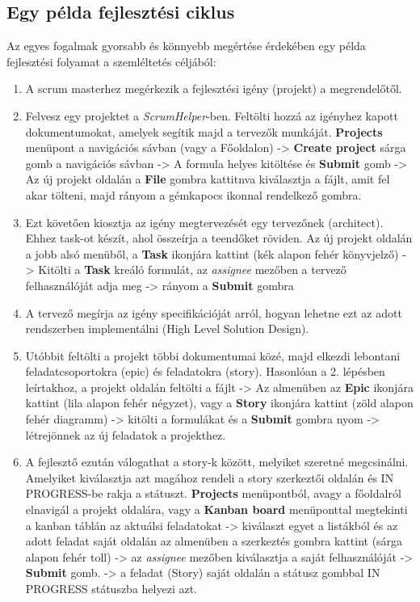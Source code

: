 \subsection{Egy példa fejlesztési ciklus}
\label{example_workflow}

Az egyes fogalmak gyorsabb és könnyebb megértése érdekében egy példa fejlesztési folyamat a szemléltetés céljából:

\begin{enumerate}
	\item A scrum masterhez megérkezik a fejlesztési igény (projekt) a megrendelőtől.
	\item Felvesz egy projektet a \textit{ScrumHelper}-ben. Feltölti hozzá az igényhez kapott dokumentumokat, amelyek segítik majd a tervezők munkáját. \textbf{Projects} menüpont a navigációs sávban (vagy a Főoldalon) -> \textbf{Create project} sárga gomb a navigációs sávban -> A formula helyes kitöltése és \textbf{Submit} gomb -> Az új projekt oldalán a \textbf{File} gombra kattitnva kiválasztja a fájlt, amit fel akar tölteni, majd rányom a gémkapocs ikonnal rendelkező gombra.
	\item Ezt követően kiosztja az igény megtervezését egy tervezőnek (architect). Ehhez task-ot készít, ahol összeírja a teendőket röviden. Az új projekt oldalán a jobb alsó menüből, a \textbf{Task} ikonjára kattint (kék alapon fehér könyvjelző) -> Kitölti a \textbf{Task} kreáló formulát, az \textit{assignee} mezőben a tervező felhasználóját adja meg -> rányom a \textbf{Submit} gombra
	\item A tervező megírja az igény specifikációját arról, hogyan lehetne ezt az adott rendszerben implementálni (High Level Solution Design).
	\item Utóbbit feltölti a projekt többi dokumentumai közé, majd elkezdi lebontani feladatcsoportokra (epic) és feladatokra (story). Hasonlóan a 2. lépésben leírtakhoz, a projekt oldalán feltölti a fájlt -> Az almenüben az \textbf{Epic} ikonjára kattint (lila alapon fehér négyzet), vagy a \textbf{Story} ikonjára kattint (zöld alapon fehér diagramm) -> kitölti a formulákat és a \textbf{Submit} gombra nyom -> létrejönnek az új feladatok a projekthez.
	\item A fejlesztő ezután válogathat a story-k között, melyiket szeretné megcsinálni. Amelyiket kiválasztja azt magához rendeli a story szerkeztői oldalán és IN PROGRESS-be rakja a státuszt. \textbf{Projects} menüpontból, avagy a főoldalról elnavigál a projekt oldalára, vagy a \textbf{Kanban board} menüponttal megtekinti a kanban táblán az aktuálsi feladatokat -> kiválaszt egyet a listákból és az adott feladat saját oldalán az almenüben a szerkeztés gombra kattint (sárga alapon fehér toll) -> az \textit{assignee} mezőben kiválasztja a saját felhasználóját -> \textbf{Submit} gomb. -> a feladat (Story) saját oldalán a státusz gombbal IN PROGRESS státuszba helyezi azt.

\end{enumerate}
